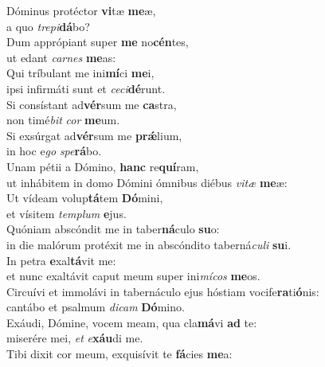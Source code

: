 \evenverse Dóminus protéctor \textbf{vi}tæ \textbf{me}æ,~\*\\
\evenverse a quo \textit{tre}\textit{pi}\textbf{dá}bo?\\
\oddverse Dum apprópiant super \textbf{me} no\textbf{cén}tes,~\*\\
\oddverse ut edant \textit{car}\textit{nes} \textbf{me}as:\\
\evenverse Qui tríbulant me ini\textbf{mí}ci \textbf{me}i,~\*\\
\evenverse ipsi infirmáti sunt et \textit{ce}\textit{ci}\textbf{dé}runt.\\
\oddverse Si consístant ad\textbf{vér}sum me \textbf{ca}stra,~\*\\
\oddverse non timé\textit{bit} \textit{cor} \textbf{me}um.\\
\evenverse Si exsúrgat ad\textbf{vér}sum me \textbf{prǽ}lium,~\*\\
\evenverse in hoc e\textit{go} \textit{spe}\textbf{rá}bo.\\
\oddverse Unam pétii a Dómino, \textbf{hanc} re\textbf{quí}ram,~\*\\
\oddverse ut inhábitem in domo Dómini ómnibus diébus \textit{vi}\textit{tæ} \textbf{me}æ:\\
\evenverse Ut vídeam volup\textbf{tá}tem \textbf{Dó}mini,~\*\\
\evenverse et vísitem \textit{tem}\textit{plum} \textbf{e}jus.\\
\oddverse Quóniam abscóndit me in taber\textbf{ná}culo \textbf{su}o:~\*\\
\oddverse in die malórum protéxit me in abscóndito taberná\textit{cu}\textit{li} \textbf{su}i.\\
\evenverse In petra \textbf{e}xal\textbf{tá}vit me:~\*\\
\evenverse et nunc exaltávit caput meum super ini\textit{mí}\textit{cos} \textbf{me}os.\\
\oddverse Circuívi et immolávi in tabernáculo ejus hóstiam vocife\textbf{ra}ti\textbf{ó}nis:~\*\\
\oddverse cantábo et psalmum \textit{di}\textit{cam} \textbf{Dó}mino.\\
\evenverse Exáudi, Dómine, vocem meam, qua cla\textbf{má}vi \textbf{ad} te:~\*\\
\evenverse miserére mei, \textit{et} \textit{e}\textbf{xáu}di me.\\
\oddverse Tibi dixit cor meum, exquisívit te \textbf{fá}cies \textbf{me}a:~\*\\
